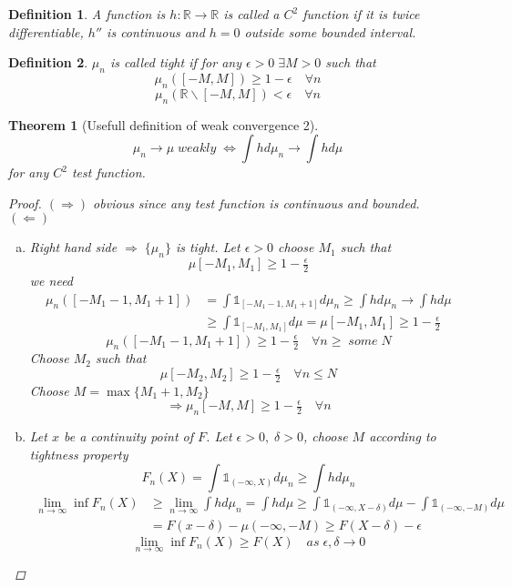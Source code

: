 \documentclass[12pt]{article}
\def\RR{\mathbb{R}}
\newtheorem{theorem}{Theorem}[section]
\newtheorem{definition}{Definition}[section]
\begin{document}
\begin{definition}
A function is $h:\RR\rightarrow \RR$ is called a $C^2$ function if it is twice differentiable, $h''$ is continuous and $h=0$ outside some bounded interval.
\end{definition}

\begin{definition}
$\mu_n $ is called tight if for any $\epsilon > 0 \; \exists M>0$ such that
\[\mu_n([-M,M])\geq 1-\epsilon \quad \forall n\]
\[\mu_n(\RR \backslash[-M,M]) < \epsilon \quad \forall n\]
\end{definition}

\begin{theorem}[Usefull definition of weak convergence 2]
\[\mu_n \rightarrow \mu \; weakly \; \Leftrightarrow \int h d\mu_n \rightarrow \int h d\mu\]
for any $C^2$ test function.
\begin{proof}
$(\Rightarrow)$ obvious since any test function is continuous and bounded.\\
$(\Leftarrow)$ 
\begin{enumerate}[(a)]
\item Right hand side $\Rightarrow \;\{\mu_n\}$ is tight. Let $\epsilon >0$ choose $M_1$ such that
\[\mu[-M_1, M_1] \geq 1 - \tfrac{\epsilon}{2}\]
we need 
\begin{align*}
\mu_n ([-M_1 -1 , M_1 +1]) &= \int{\mathbb 1}_{[-M_1 -1 , M_1 +1]}d\mu_n \geq \int h d\mu_n \rightarrow \int h d \mu \\
&\geq \int{\mathbb 1}_{[-M_1 , M_1]}d\mu = \mu[-M_1, M_1] \geq 1 - \tfrac{\epsilon}{2}\end{align*}
\[\mu_n ([-M_1 -1 , M_1 +1]) \geq  1 - \tfrac{\epsilon}{2}\quad \forall n \geq \;some \; N \]
Choose $M_2$ such that
\[\mu[-M_2, M_2] \geq 1 - \tfrac{\epsilon}{2} \quad \forall n \leq N\]
Choose $M = \max\{M_1 +1, M_2\}$
\[\Rightarrow \mu_n[-M,M] \geq  1 - \tfrac{\epsilon}{2}  \quad  \forall n\]
\item Let $x$ be a continuity point of $F$. Let $\epsilon >0, \; \delta >0$, choose $M$ according to tightness property 
\[F_n(X) = \int{\mathbb 1}_{(-\infty, X)}d\mu_n \geq \int h d\mu_n\]
\begin{align*}
\lim_{n \rightarrow \infty}\inf F_n(X) &\geq \lim_{n \rightarrow \infty}\int h d\mu_n = \int h d\mu \geq \int{\mathbb 1}_{(-\infty, X-\delta)}d\mu -  \int{\mathbb 1}_{(-\infty, -M)}d\mu \\
&=F(x-\delta) - \mu(-\infty, -M) \geq F(X-\delta) - \epsilon
\end{align*}
\[\boxed{\lim_{n\rightarrow \infty}\inf F_n(X) \geq F(X) \quad as\; \epsilon,\delta \rightarrow 0}\]

\end{enumerate}
\end{proof}
\end{theorem}
\end{document}
